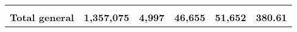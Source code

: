 \begin{tabular}{lrcclr}
	& \multicolumn{1}{l}{}                                           & \multicolumn{1}{l}{}                                       & \multicolumn{1}{l}{} &                                                                     & \multicolumn{1}{l}{}                                                         \\
	\rowcolor[HTML]{DDEBF7} 
	\textbf{Total   general}                                       & \textbf{1,357,075}                                             & \multicolumn{1}{r}{\cellcolor[HTML]{DDEBF7}\textbf{4,997}} & \textbf{46,655}      & \textbf{51,652}                                                     & \textbf{380.61}                                                             
\end{tabular}